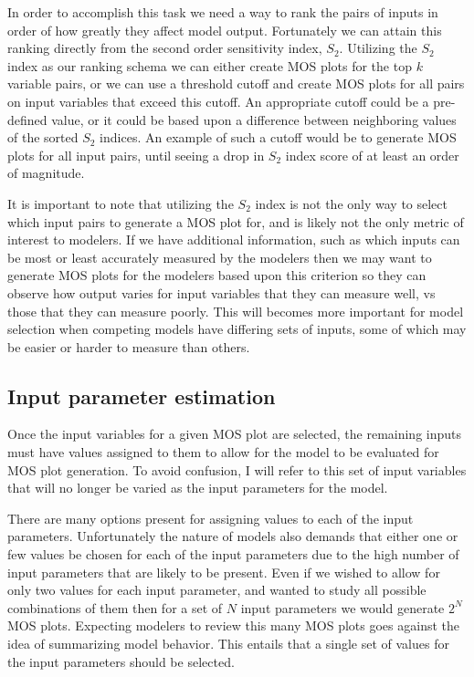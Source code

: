 In order to accomplish this task we need a way to rank the pairs of inputs in order of how greatly they affect model output. Fortunately we can attain this ranking directly from the second order sensitivity index, $S_2$. Utilizing the $S_2$ index as our ranking schema we can either create MOS plots for the top $k$ variable pairs, or we can use a threshold cutoff and create MOS plots for all pairs on input variables that exceed this cutoff. An appropriate cutoff could be a pre-defined value, or it could be based upon a difference between neighboring values of the sorted $S_2$ indices. An example of such a cutoff would be to generate MOS plots for all input pairs, until seeing a drop in $S_2$ index score of at least an order of magnitude.

It is important to note that utilizing the $S_2$ index is not the only way to select which input pairs to generate a MOS plot for, and is likely not the only metric of interest to modelers. If we have additional information, such as which inputs can be most or least accurately measured by the modelers then we may want to generate MOS plots for the modelers based upon this criterion so they can observe how output varies for input variables that they can measure well, vs those that they can measure poorly. This will becomes more important for model selection when competing models have differing sets of inputs, some of which may be easier or harder to measure than others.

\subsection{Input parameter estimation\label{sec:inp_param_est}}
Once the input variables for a given MOS plot are selected, the remaining inputs must have values assigned to them to allow for the model to be evaluated for MOS plot generation. To avoid confusion, I will refer to this set of input variables that will no longer be varied as the input parameters for the model.

There are many options present for assigning values to each of the input parameters. Unfortunately the nature of models also demands that either one or few values be chosen for each of the input parameters due to the high number of input parameters that are likely to be present. Even if we wished to allow for only two values for each input parameter, and wanted to study all possible combinations of them then for a set of $N$ input parameters we would generate $2^N$ MOS plots. Expecting modelers to review this many MOS plots goes against the idea of summarizing model behavior. This entails that a single set of values for the input parameters should be selected.

